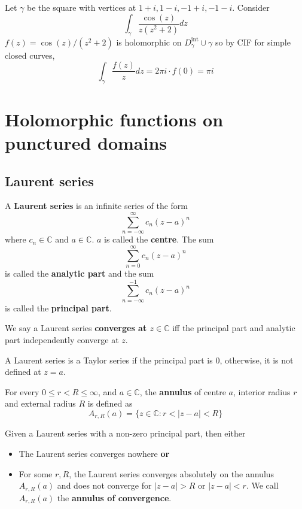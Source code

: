 \begin{example}
	Let $\gamma$ be the square with vertices at $1 + i, 1 - i, -1 + i, -1 - i$. Consider
	\[
		\int_{\gamma} \frac{\cos(z)}{z (z^2 + 2)} dz
	\]
	$f(z) = \cos(z) / (z^2 + 2)$ is holomorphic on $D_{\gamma}^{\text{int}} \cup \gamma$ so by CIF for simple closed curves,
	\[
		\int_{\gamma} \frac{f(z)}{z} dz = 2 \pi i \cdot f(0) = \pi i
	\]
\end{example}

\section{Holomorphic functions on punctured domains}

\subsection{Laurent series}

\begin{definition}
	A \textbf{Laurent series} is an infinite series of the form
	\[
		\sum_{n = -\infty}^{\infty} c_n {(z - a)}^n
	\]
	where $c_n \in \mathbb{C}$ and $a \in \mathbb{C}$. $a$ is called the \textbf{centre}. The sum
	\[
		\sum_{n = 0}^{\infty} c_n {(z - a)}^n
	\]
	is called the \textbf{analytic part} and the sum
	\[
		\sum_{n = -\infty}^{-1} c_n {(z - a)}^n
	\]
	is called the \textbf{principal part}.
\end{definition}

\begin{definition}
	We say a Laurent series \textbf{converges at $z \in \mathbb{C}$} iff the principal part and analytic part independently converge at $z$.
\end{definition}

\begin{remark}
	A Laurent series is a Taylor series if the principal part is $0$, otherwise, it is not defined at $z = a$.
\end{remark}

\begin{definition}
	For every $0 \le r < R \le \infty$, and $a \in \mathbb{C}$, the \textbf{annulus} of centre $a$, interior radius $r$ and external radius $R$ is defined as
	\[
		A_{r, R}(a) = \{ z \in \mathbb{C}: r < |z - a| < R \}
	\]
\end{definition}

\begin{proposition}
	Given a Laurent series with a non-zero principal part, then either
	\begin{itemize}
		\item The Laurent series converges nowhere \textbf{or}
		\item For some $r, R$, the Laurent series converges absolutely on the annulus $A_{r, R}(a)$ and does not converge for $|z - a| > R$ or $|z - a| < r$. We call $A_{r, R}(a)$ the \textbf{annulus of convergence}.
	\end{itemize}
\end{proposition}

